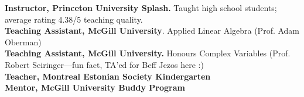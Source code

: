 \documentclass[4pt, letterpaper]{article}
\begin{document}
\textbf{Instructor, Princeton University Splash.} Taught high school students; average rating 4.38/5 teaching quality.\\
\textbf{Teaching Assistant, McGill University}. Applied Linear Algebra (Prof. Adam Oberman)\\ %
\textbf{Teaching Assistant, McGill University.} Honours Complex Variables (Prof. Robert Seiringer---fun fact, TA'ed for Beff Jezos here :)\\%
 \textbf{Teacher, {Montreal Estonian Society} Kindergarten}\\
 \textbf{Mentor, McGill University
  {Buddy
    Program}}
\end{document}
